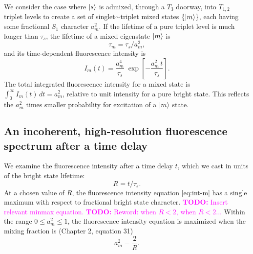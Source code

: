 \documentclass[12pt]{mitthesis}
\newcommand{\TODO} [1]{\textcolor{magenta}{\textbf{TODO:} #1}}
\begin{document}
We consider the case where $\mathinner{|{s}\rangle}$ is admixed, through a $T_3$
doorway, into $T_{1,2}$ triplet levels to create a set of
singlet$\sim$triplet mixed states $\lbrace\mathinner{|{m}\rangle}\rbrace$, each having
some fractional $S_1$ character $a_m^2$.  If the lifetime of a pure
triplet level is much longer than $\tau_s$, the lifetime of a mixed
eigenstate $\mathinner{|{m}\rangle}$ is
\begin{equation}
  \label{eq:tau-m}
  \tau_m = \tau_s / a_m^2,
\end{equation}
and its time-dependent fluorescence intensity is
\begin{equation}
  \label{eq:int-m}
  I_m(t) = \frac{a_m^4}{\tau_s} \;
           \exp \left[
             -\frac{a_m^2 \, t}{\tau_s} 
           \right].
\end{equation}
The total integrated fluorescence intensity for a mixed state is
$\int_0^{\infty} I_m(t) \, dt = a_m^2$, relative to unit intensity for
a pure bright state.  This reflects the $a_m^2$ times smaller
probability for excitation of a $\mathinner{|{m}\rangle}$ state.


\subsection{An incoherent, high-resolution fluorescence spectrum after
  a time delay}

We examine the fluorescence intensity after a time delay $t$,
which we cast in units of the bright state lifetime:
\begin{equation}
  R = t / \tau_s.
\end{equation}
At a chosen value of $R$, the fluorescence intensity equation
\ref{eq:int-m} has a single maximum with respect to fractional bright
state character.  \TODO{Insert relevant minmax equation.}
\TODO{Reword: when $R<2$, when $R<2$...} Within the range $0 \le a_m^2
\le 1$, the fluorescence intensity equation is maximized when the
mixing fraction is (Chapter 2, equation 31)
\begin{equation}
  \label{eq:am-max}
  a_m^2 = \frac{2}{R}.
\end{equation}
\end{document}
